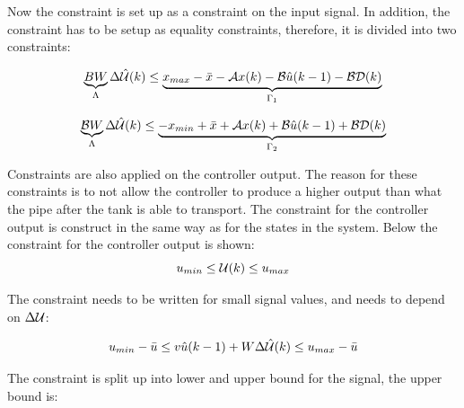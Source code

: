 


 Now the constraint is set up as a constraint on the input signal. In addition, the constraint has to be setup as equality constraints, therefore, it is divided into two constraints: 

 \begin{equation}
 \underbrace{BW}_{\Lambda} \Delta\hat{\CMcal{U}}(k)\leq \underbrace{x_{max}- \bar{x}-\CMcal{A}x(k)-\CMcal{B}\hat{u}(k-1)-\CMcal{B}\CMcal{D}(k)}_{\Gamma_1}
 \end{equation}  

 \begin{equation}
 \underbrace{\CMcal{B}W}_{\Lambda} \Delta\hat{\CMcal{U}}(k) \leq \underbrace{-x_{min}+\bar{x}+\CMcal{A}x(k)+\CMcal{B}\hat{u}(k-1)+\CMcal{B}\CMcal{D}(k)}_{\Gamma_2}
 \end{equation}


Constraints are also applied on the controller output. The reason for these constraints is to not allow the controller to produce a higher output than what the pipe after the tank is able to transport. The constraint for the controller output is construct in the same way as for the states in the system. Below the constraint for the controller output is shown:  
 \begin{equation}
 	u_{min} \leq \CMcal{U}(k) \leq u_{max}
 \end{equation}

The constraint needs to be written for small signal values, and needs to depend on $\Delta \CMcal{U}$:

 \begin{equation}
 		u_{min} -  \bar{u} \leq v\hat{u}(k-1)+ W\Delta\hat{\CMcal{U}}(k)  \leq  u_{max} -  \bar{u}
 \end{equation}

The constraint is split up into lower and upper bound for the signal, the upper bound is:

